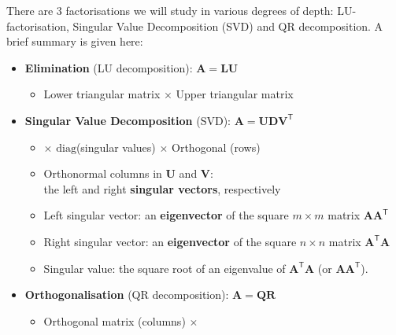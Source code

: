 There are 3 factorisations we will study in various degrees of depth: LU-factorisation, Singular Value Decomposition (SVD) and  QR decomposition.  A brief summary is given here:
\begin{itemize}
\item {\bf Elimination} (LU decomposition): $\mathbf{A}=\mathbf{LU}$ 
\begin{itemize} \item Lower triangular matrix 
$\times$
 Upper triangular matrix 
\end{itemize}
\item {\bf Singular Value Decomposition} (SVD): $\mathbf{A}=\mathbf{UDV}^\mathsf{T}$ 
\begin{itemize}
\item 
{}
$\times$
 $\mathrm{diag}$(singular values) $\times$
Orthogonal (rows)
\item Orthonormal columns in $\mathbf{U}$ and $\mathbf{V}$: \\the left and right {\bf singular vectors}, respectively
\item {Left singular vector}: an {\bf eigenvector} of the square $m \times m$ matrix $\mathbf{AA}^{\mathsf{T}}$
\item {Right singular vector}: an {\bf eigenvector} of the square $n \times n$ matrix $\mathbf{A}^\mathsf{T}\mathbf{A}$
\item{Singular value}: the square root of an eigenvalue of $\mathbf A^{\mathsf T}\mathbf A$ (or $\mathbf {AA}^{\mathsf T}$).
\end{itemize}
\item {\bf Orthogonalisation} (QR decomposition):  $\mathbf{A}=\mathbf{QR}$ 
\begin{itemize} \item Orthogonal matrix (columns) 
$\times$ 
\end{itemize}

\end{itemize}




